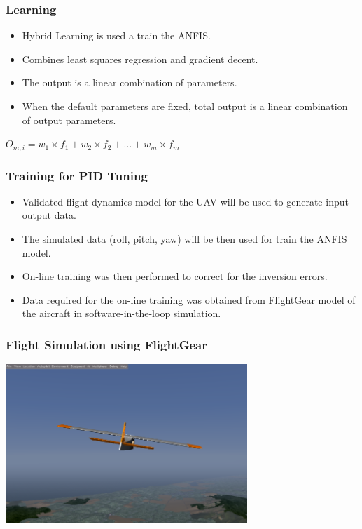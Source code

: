 \documentclass{beamer}
\begin{document}
   \begin{frame}
      \frametitle{Learning}
      \begin{itemize}
         \item Hybrid Learning is used a train the ANFIS.
         \item Combines least squares regression and gradient decent.
         \item The  output  is  a  linear  combination  of  parameters.  
         \item When the default parameters are fixed, total output is a linear combination of output parameters.
      \end{itemize}
      $ O_{m,i} = w_1 \times f_1 + w_2 \times f_2 + ... + w_m \times f_m $
   \end{frame}
   
   \begin{frame}
      \frametitle{Training for PID Tuning}
      \begin{itemize}
         \item Validated flight dynamics model for the UAV will be used to generate input-output data.
         \item The simulated data (roll, pitch, yaw) will be then used for train the ANFIS model.
         \item On-line training was then performed to correct for the inversion errors.
         \item Data required for the on-line training was obtained from FlightGear model of the aircraft in software-in-the-loop simulation.
      \end{itemize}
   \end{frame}
   
   \begin{frame}
      \frametitle{Flight Simulation using FlightGear}
      \includegraphics[height=6cm]{flightgear}
   \end{frame}
\end{document}
